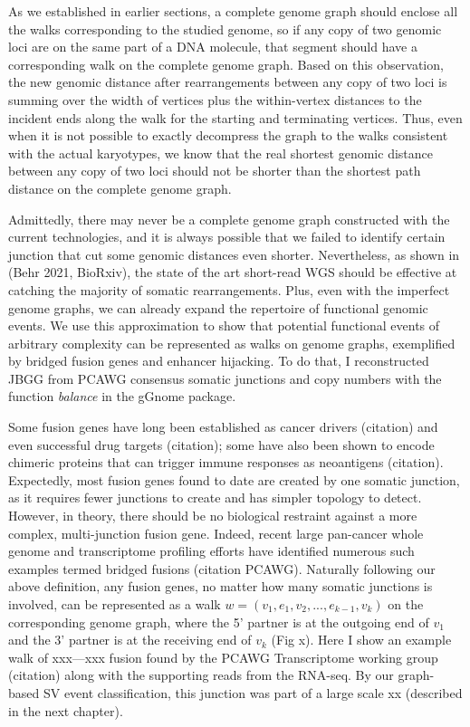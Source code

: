 \documentclass[phd,tocprelim]{cornell}
\begin{document}
As we established in earlier sections, a complete genome graph should enclose all the walks corresponding to the studied genome, so if any copy of two genomic loci are on the same part of a DNA molecule, that segment should have a corresponding walk on the complete genome graph. Based on this observation, the new genomic distance after rearrangements between any copy of two loci is summing over the width of vertices plus the within-vertex distances to the incident ends along the walk for the starting and terminating vertices. Thus, even when it is not possible to exactly decompress the graph to the walks consistent with the actual karyotypes, we know that the real shortest genomic distance between any copy of two loci should not be shorter than the shortest path distance on the complete genome graph.

Admittedly, there may never be a complete genome graph constructed with the current technologies, and it is always possible that we failed to identify certain junction that cut some genomic distances even shorter. Nevertheless, as shown in (Behr 2021, BioRxiv), the state of the art short-read WGS should be effective at catching the majority of somatic rearrangements. Plus, even with the imperfect genome graphs, we can already expand the repertoire of functional genomic events. We use this approximation to show that potential functional events of arbitrary complexity can be represented as walks on genome graphs, exemplified by bridged fusion genes and enhancer hijacking. To do that, I reconstructed JBGG from PCAWG consensus somatic junctions and copy numbers with the function \textit{balance} in the gGnome package.

Some fusion genes have long been established as cancer drivers (citation) and even successful drug targets (citation); some have also been shown to encode chimeric proteins that can trigger immune responses as neoantigens (citation). Expectedly, most fusion genes found to date are created by one somatic junction, as it requires fewer junctions to create and has simpler topology to detect. However, in theory, there should be no biological restraint against a more complex, multi-junction fusion gene. Indeed, recent large pan-cancer whole genome and transcriptome profiling efforts have identified numerous such examples termed bridged fusions (citation PCAWG). Naturally following our above definition, any fusion genes, no matter how many somatic junctions is involved, can be represented as a walk $w = (v_1, e_1, v_2, ..., e_{k-1}, v_k)$ on the corresponding genome graph, where the 5’ partner is at the outgoing end of $v_1$ and the 3’ partner is at the receiving end of $v_k$ (Fig x). Here I show an example walk of xxx—xxx fusion found by the PCAWG Transcriptome working group (citation) along with the supporting reads from the RNA-seq. By our graph-based SV event classification, this junction was part of a large scale xx (described in the next chapter).
\end{document}
